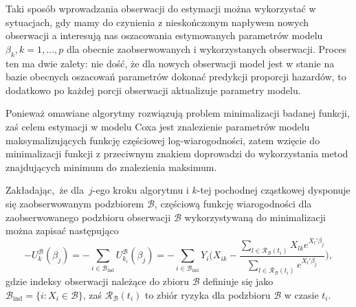 Taki sposób wprowadzania obserwacji do estymacji można wykorzystać w sytuacjach, gdy mamy do czynienia z nieskończonym napływem nowych obserwacji a interesują nas oszacowania estymowanych parametrów modelu $\beta_k, k=1,\dots,p$ dla obecnie zaobserwowanych i wykorzystanych obserwacji. Proces ten ma dwie zalety: nie dość, że dla nowych obserwacji model jest w stanie na bazie obecnych oszacowań parametrów dokonać predykcji proporcji hazardów, to dodatkowo po każdej porcji obserwacji aktualizuje parametry modelu.

Ponieważ
omawiane algorytmy rozwiązują problem minimalizacji badanej funkcji, zaś
celem estymacji w modelu Coxa jest znalezienie parametrów modelu
maksymalizujących funkcję częściowej log-wiarogodności, zatem wzięcie do
minimalizacji funkcji z przeciwnym znakiem doprowadzi do wykorzystania
metod znajdujących minimum do znalezienia maksimum. 

Zakładając,~że dla~\(j\)-ego kroku
algorytmu i \(k\)-tej pochodnej cząstkowej dysponuje się zaobserwowanym podzbiorem
\(\mathcal{B}\), częściową funkcję wiarogodności dla zaobserwowanego podzbioru obserwacji \(\mathcal{B}\) wykorzystywaną do minimalizacji można zapisać następująco
\begin{equation}
-U^\mathcal{B}_k(\beta_j)=-\sum\limits_{i \in \mathcal{B}_\text{ind}}^{}U^\mathcal{B}_{k_{i}}(\beta_j)=-\sum\limits_{i \in \mathcal{B}_\text{ind}}^{}Y_i\Big(X_{ik}-\dfrac{\sum\limits_{l\in \mathscr{R}_\mathcal{B}(t_i)}^{} X_{lk} e^{X_l'\beta_j}}{\sum\limits_{l\in \mathscr{R}_\mathcal{B}(t_i)}^{} e^{X_l'\beta_j}}\Big),
\end{equation}
gdzie indeksy obserwacji należące do zbioru \(\mathcal{B}\) definiuje się jako
\(\mathcal{B}_{\text{ind}} = \{i: X_i \in \mathcal{B} \}\), zaś
\(\mathscr{R}_\mathcal{B}(t_i)\) to zbiór ryzyka dla podzbioru
\(\mathcal{B}\) w czasie \(t_i\).

